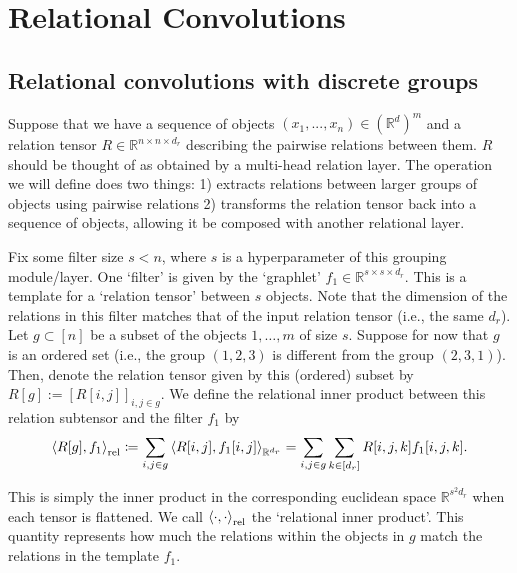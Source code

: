 \section{Relational Convolutions}\label{sec:relconv}

\subsection{Relational convolutions with discrete groups}
Suppose that we have a sequence of objects $(x_1, ..., x_n) \in (\mathbb{R}^{d})^m$ and a relation tensor $R \in \mathbb{R}^{n \times n \times d_r}$ describing the pairwise relations between them. $R$ should be thought of as obtained by a multi-head relation layer. The operation we will define does two things: 1) extracts relations between larger groups of objects using pairwise relations 2) transforms the relation tensor back into a sequence of objects, allowing it be composed with another relational layer.

Fix some filter size $s < n$, where $s$ is a hyperparameter of this grouping module/layer. One `filter' is given by the `graphlet' $f_1 \in \mathbb{R}^{s \times s \times d_r}$. This is a template for a `relation tensor' between $s$ objects. Note that the dimension of the relations in this filter matches that of the input relation tensor (i.e., the same $d_r$). Let $g \subset [n]$ be a subset of the objects $1, \ldots, m$ of size $s$. Suppose for now that $g$ is an ordered set (i.e., the group $(1, 2, 3)$ is different from the group $(2, 3, 1)$). Then, denote the relation tensor given by this (ordered) subset by $R[g] := [R[i,j]]_{i,j \in g}$. We define the relational inner product between this relation subtensor and the filter $f_1$ by
\begin{equation}
    \label{eq:relational_inner_prod_one_filt}
    \left\langle R[g], f_1 \right\rangle_\mathrm{rel} \coloneqq \sum_{i,j \in g} \left \langle R[i,j], f_1[i,j] \right\rangle_{\mathbb{R}^{d_r}} = \sum_{i,j \in g} \sum_{k \in [d_r]} R[i,j,k] f_1[i,j,k].
\end{equation}

This is simply the inner product in the corresponding euclidean space $\mathbb{R}^{s^2 d_r}$ when each tensor is flattened. We call $\left \langle \cdot, \cdot \right\rangle_{\mathrm{rel}}$ the `relational inner product'. This quantity represents how much the relations within the objects in $g$ match the relations in the template $f_1$.


